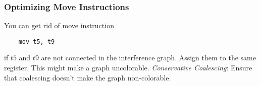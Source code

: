 \subsubsection{Optimizing Move Instructions} %
\label{ssub:Optimizing Move Instructions}
You can get rid of move instruction
\begin{lstlisting}
	mov t5, t9
\end{lstlisting}
if $t5$ and $t9$ are not connected in the interference graph. Assign them to the same register. This might make a graph uncolorable. \emph{Conservative Coalescing}: Ensure that coalescing doesn't make the graph non-colorable.

